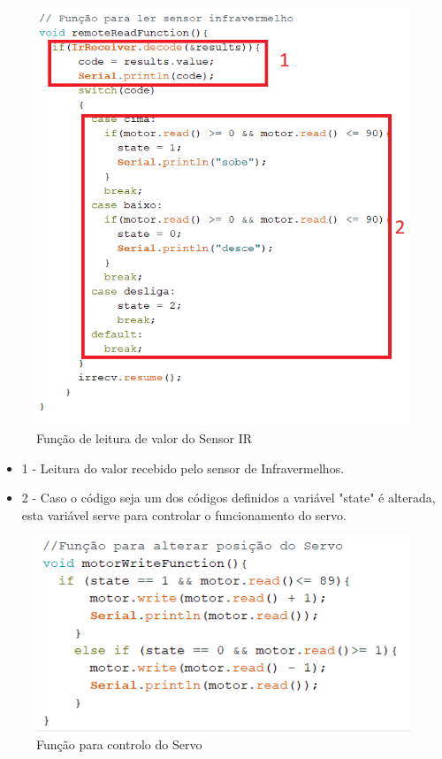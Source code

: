\begin{figure}[H]
    \centering
    \includegraphics[scale=0.5]{images/codigo/sisC_remoteFunctionRead.png}
    \caption{Função de leitura de valor do Sensor IR}
\end{figure}

\begin{itemize}
    \item 1 - Leitura do valor recebido pelo sensor de Infravermelhos.
    \item 2 - Caso o código seja um dos códigos definidos a variável "state" é alterada, esta variável serve para controlar o funcionamento do servo.
\end{itemize}

\begin{figure}[H]
    \centering
    \includegraphics[scale=0.6]{images/codigo/sisC_servofunction.png}
    \caption{Função para controlo do Servo}
\end{figure}

